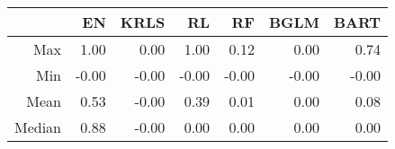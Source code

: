 \begin{table}[ht]
\centering
\begin{tabular}{rrrrrrr}
  \hline
 & EN & KRLS & RL & RF & BGLM & BART \\ 
  \hline
Max & 1.00 & 0.00 & 1.00 & 0.12 & 0.00 & 0.74 \\ 
  Min & -0.00 & -0.00 & -0.00 & -0.00 & -0.00 & -0.00 \\ 
  Mean & 0.53 & -0.00 & 0.39 & 0.01 & 0.00 & 0.08 \\ 
  Median & 0.88 & -0.00 & 0.00 & 0.00 & 0.00 & 0.00 \\ 
   \hline
\end{tabular}
\end{table}
